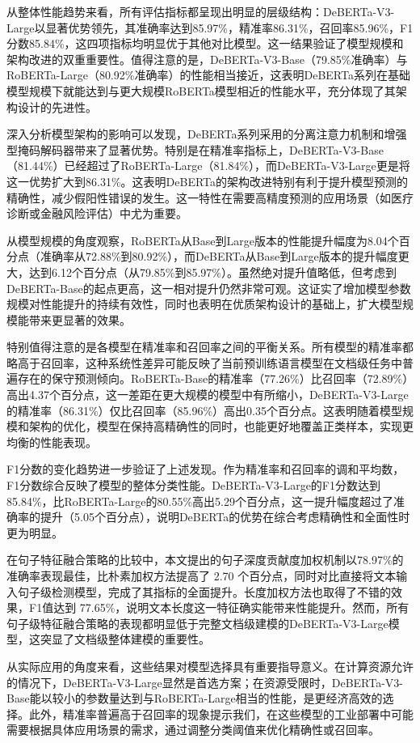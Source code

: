 从整体性能趋势来看，所有评估指标都呈现出明显的层级结构：DeBERTa-V3-Large以显著优势领先，其准确率达到85.97\%，精准率86.31\%，召回率85.96\%，F1分数85.84\%，这四项指标均明显优于其他对比模型。这一结果验证了模型规模和架构改进的双重重要性。值得注意的是，DeBERTa-V3-Base（79.85\%准确率）与RoBERTa-Large（80.92\%准确率）的性能相当接近，这表明DeBERTa系列在基础模型规模下就能达到与更大规模RoBERTa模型相近的性能水平，充分体现了其架构设计的先进性。

深入分析模型架构的影响可以发现，DeBERTa系列采用的分离注意力机制和增强型掩码解码器带来了显著优势。特别是在精准率指标上，DeBERTa-V3-Base（81.44\%）已经超过了RoBERTa-Large（81.84\%），而DeBERTa-V3-Large更是将这一优势扩大到86.31\%。这表明DeBERTa的架构改进特别有利于提升模型预测的精确性，减少假阳性错误的发生。这一特性在需要高精度预测的应用场景（如医疗诊断或金融风险评估）中尤为重要。

从模型规模的角度观察，RoBERTa从Base到Large版本的性能提升幅度为8.04个百分点（准确率从72.88\%到80.92\%），而DeBERTa从Base到Large版本的提升幅度更大，达到6.12个百分点（从79.85\%到85.97\%）。虽然绝对提升值略低，但考虑到DeBERTa-Base的起点更高，这一相对提升仍然非常可观。这证实了增加模型参数规模对性能提升的持续有效性，同时也表明在优质架构设计的基础上，扩大模型规模能带来更显著的效果。

特别值得注意的是各模型在精准率和召回率之间的平衡关系。所有模型的精准率都略高于召回率，这种系统性差异可能反映了当前预训练语言模型在文档级任务中普遍存在的保守预测倾向。RoBERTa-Base的精准率（77.26\%）比召回率（72.89\%）高出4.37个百分点，这一差距在更大规模的模型中有所缩小，DeBERTa-V3-Large的精准率（86.31\%）仅比召回率（85.96\%）高出0.35个百分点。这表明随着模型规模和架构的优化，模型在保持高精确性的同时，也能更好地覆盖正类样本，实现更均衡的性能表现。

F1分数的变化趋势进一步验证了上述发现。作为精准率和召回率的调和平均数，F1分数综合反映了模型的整体分类性能。DeBERTa-V3-Large的F1分数达到85.84\%，比RoBERTa-Large的80.55\%高出5.29个百分点，这一提升幅度超过了准确率的提升（5.05个百分点），说明DeBERTa的优势在综合考虑精确性和全面性时更为明显。

在句子特征融合策略的比较中，本文提出的句子深度贡献度加权机制以78.97\%的准确率表现最佳，比朴素加权方法提高了 2.70 个百分点，同时对比直接将文本输入句子级检测模型，完成了其指标的全面提升。长度加权方法也取得了不错的效果，F1值达到 77.65\%，说明文本长度这一特征确实能带来性能提升。然而，所有句子级特征融合策略的表现都明显低于完整文档级建模的DeBERTa-V3-Large模型，这突显了文档级整体建模的重要性。

从实际应用的角度来看，这些结果对模型选择具有重要指导意义。在计算资源允许的情况下，DeBERTa-V3-Large显然是首选方案；在资源受限时，DeBERTa-V3-Base能以较小的参数量达到与RoBERTa-Large相当的性能，是更经济高效的选择。此外，精准率普遍高于召回率的现象提示我们，在这些模型的工业部署中可能需要根据具体应用场景的需求，通过调整分类阈值来优化精确性或召回率。

